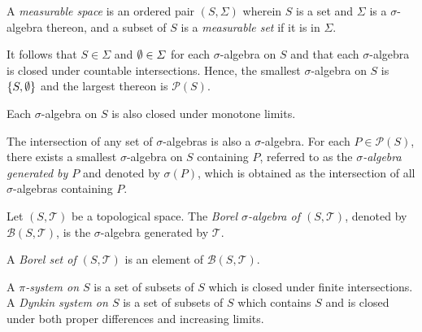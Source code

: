   A \emph{measurable space} is an ordered pair \((S, \varSigma)\) wherein \(S\) is a set and \(\varSigma\) is a
  \(\sigma\)-algebra thereon, and a subset of \(S\) is a \emph{measurable set} if it is in \(\varSigma\).
\Edf

It follows that \(S \in \varSigma\) and \(\emptyset \in \varSigma\) for each \(\sigma\)-algebra on \(S\) and that each
\(\sigma\)-algebra is closed under countable intersections. Hence, the smallest \(\sigma\)-algebra on \(S\) is \(\{S,
\emptyset\}\) and the largest thereon is \(\mathcal{P}(S)\).

Each \(\sigma\)-algebra on \(S\) is also closed under monotone limits. %

The intersection of any set of \(\sigma\)-algebras is also a \(\sigma\)-algebra. For each \(P \in \mathcal{P}(S)\),
there exists a smallest \(\sigma\)-algebra on \(S\) containing \(P\), referred to as the \emph{\(\sigma\)-algebra
generated by \(P\)} and denoted by \(\sigma(P)\), which is obtained as the intersection of all \(\sigma\)-algebras
containing \(P\).

\Bdf
  Let \((S, \mathcal{T})\) be a topological space. The \emph{Borel \(\sigma\)-algebra of \((S, \mathcal{T})\)}, denoted
  by \(\mathcal{B}(S, \mathcal{T})\), is the \(\sigma\)-algebra generated by \(\mathcal{T}\).

  A \emph{Borel set of \((S, \mathcal{T})\)} is an element of \(\mathcal{B}(S, \mathcal{T})\).
\Edf

A \emph{\(\pi\)-system on \(S\)} is a set of subsets of \(S\) which is closed under finite intersections. A
\emph{Dynkin system on \(S\)} is a set of subsets of \(S\) which contains \(S\) and is closed under both proper
differences and increasing limits. %

\Edc
